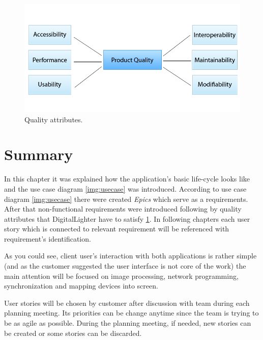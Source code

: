 \begin{figure}[!ht]
    \begin{center}
    \includegraphics[scale=0.5]{requirements/quality.png}
    \caption{Quality attributes.}
    \label{img:qualityAttributes}
    \end{center}
\end{figure}

\section{Summary}
In this chapter it was explained how the application's basic life-cycle looks like and the use case diagram \ref{img:usecase} was introduced.
According to use case diagram \ref{img:usecase} there were created \emph{Epics} which serve as a requirements. 
After that non-functional requirements were introduced following by quality attributes that DigitalLighter have to satisfy \ref{img:qualityAttributes}.
In following chapters each user story which is connected to relevant requirement will be referenced with requirement's identification.

As you could see, client user's interaction with both applications is rather simple (and as the customer suggested the user interface is not core of the work) the main attention will be focused on image processing, network programming, synchronization and mapping devices into screen.

User stories will be chosen by customer after discussion with team during each planning meeting.
Its priorities can be change anytime since the team is trying to be as agile as possible.
During the planning meeting, if needed, new stories can be created or some stories can be discarded.

